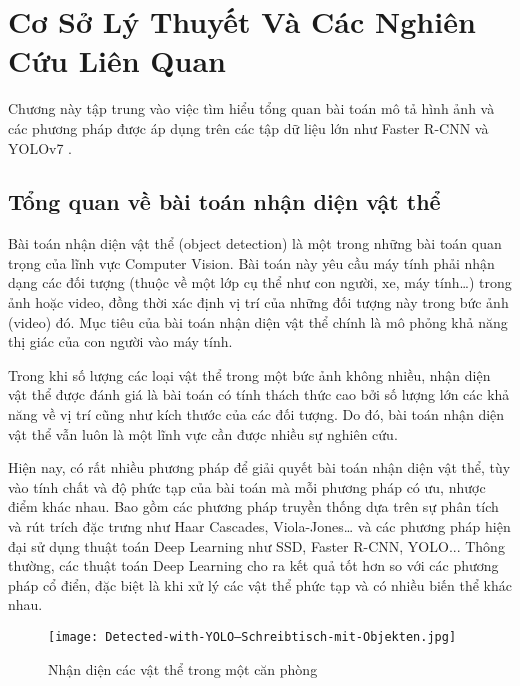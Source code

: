 \chapter{Cơ Sở Lý Thuyết Và Các Nghiên Cứu Liên Quan}
\ifpdf
    \graphicspath{{Chapter2/Chapter2Figs/PNG/}{Chapter2/Chapter2Figs/PDF/}{Chapter2/Chapter2Figs/}}
\else
    \graphicspath{{Chapter2/Chapter2Figs/EPS/}{Chapter2/Chapter2Figs/}}
\fi

Chương này tập trung vào việc tìm hiểu tổng quan bài toán mô tả hình ảnh và các phương pháp được áp dụng trên các tập dữ liệu lớn như Faster R-CNN \cite{ren2015faster} và YOLOv7 \cite{wang2022yolov7}.

\section{Tổng quan về bài toán nhận diện vật thể}
Bài toán nhận diện vật thể (object detection) là một trong những bài toán quan trọng của lĩnh vực Computer Vision. Bài toán này yêu cầu máy tính phải nhận dạng các đối tượng (thuộc về một lớp cụ thể như con người, xe, máy tính…) trong ảnh hoặc video, đồng thời xác định vị trí của những đối tượng này trong bức ảnh (video) đó. Mục tiêu của bài toán nhận diện vật thể chính là mô phỏng khả năng thị giác của con người vào máy tính.

Trong khi số lượng các loại vật thể trong một bức ảnh không nhiều, nhận diện vật thể được đánh giá là bài toán có tính thách thức cao bởi số lượng lớn các khả năng về vị trí cũng như kích thước của các đối tượng. Do đó, bài toán nhận diện vật thể vẫn luôn là một lĩnh vực cần được nhiều sự nghiên cứu.

Hiện nay, có rất nhiều phương pháp để giải quyết bài toán nhận diện vật thể, tùy vào tính chất và độ phức tạp của bài toán mà mỗi phương pháp có ưu, nhược điểm khác nhau. Bao gồm các phương pháp truyền thống dựa trên sự phân tích và rút trích đặc trưng như Haar Cascades, Viola-Jones… và các phương pháp hiện đại sử dụng thuật toán Deep Learning như SSD, Faster R-CNN, YOLO... Thông thường, các thuật toán Deep Learning cho ra kết quả tốt hơn so với các phương pháp cổ điển, đặc biệt là khi xử lý các vật thể phức tạp và có nhiều biến thể khác nhau.

\begin{figure}[h!]
	\texttt{[image: Detected-with-YOLO--Schreibtisch-mit-Objekten.jpg]}
	\caption{Nhận diện các vật thể trong một căn phòng}
\end{figure}


